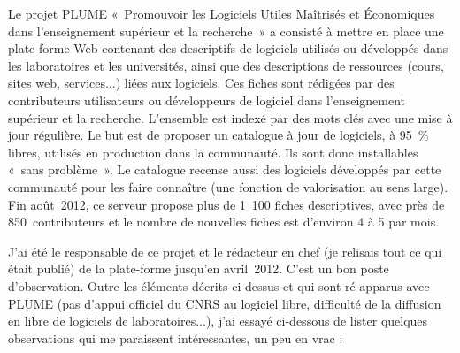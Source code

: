 \documentclass{FramateX}
\begin{document}
\begin{refsection}
Le projet PLUME «~Promouvoir les Logiciels Utiles Maîtrisés et
Économiques dans l'enseignement supérieur et la recherche~» a
consisté à mettre en place une plate-forme Web contenant des
descriptifs de logiciels utilisés ou développés dans les laboratoires
et les universités, ainsi que des descriptions de ressources (cours,
sites web, services...) liées aux logiciels. Ces fiches sont rédigées
par des contributeurs utilisateurs ou développeurs de logiciel dans
l'enseignement supérieur et la recherche. L'ensemble est indexé par des
mots clés avec une mise à jour régulière. Le but est de proposer un
catalogue à jour de logiciels, à 95~\% libres, utilisés en production
dans la communauté. Ils sont donc installables «~sans problème~». Le
catalogue recense aussi des logiciels développés par cette communauté
pour les faire connaître (une fonction de valorisation au sens large).
Fin août~2012, ce serveur propose plus de 1~100 fiches descriptives,
avec près de 850~contributeurs et le nombre de nouvelles fiches est
d'environ 4 à 5 par mois.

J'ai été le responsable de ce projet et le rédacteur en chef (je
relisais tout ce qui était publié) de la plate-forme jusqu'en
avril~2012. C'est un bon poste d'observation. Outre les éléments
décrits ci-dessus et qui sont ré-apparus avec PLUME (pas d'appui
officiel du CNRS au logiciel libre, difficulté de la diffusion en libre
de logiciels de laboratoires...), j'ai essayé ci-dessous de lister
quelques observations qui me paraissent intéressantes, un peu en vrac :


\end{refsection}
\end{document}
